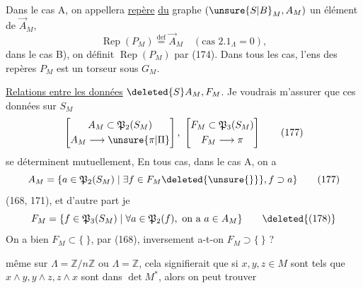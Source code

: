 Dans le cas A, on appellera \uline{repère} \uline{du} graphe  $(\unsure{S|B}_M,A_M)$ un élément de $\overrightarrow A_M$, 
\[
 \operatorname{Rep}(P_M)\overset{\mathrm{def}}{=}\overrightarrow A_M\quad(\text{cas }2.1_{\Lambda}=0),\tag*{(176)}
\]
dans le cas B), on définit $\operatorname{Rep}(P_M)$  par (174). Dans tous les cas, l'ens des repères  $P_M$ est un torseur sous $G_M$.

\uline{Relations entre les données} $\deleted{S}A_M,F_M$. Je voudrais m'assurer que ces données sur $S_M$
\[
 \left[\begin{gathered}A_M\subset\mathfrak P_2(S_M)\\A_M\longrightarrow\unsure{\pi|\Pi}\end{gathered}\right],\
 \left[\begin{gathered}F_M\subset\mathfrak P_3(S_M)\\F_M\longrightarrow\pi\end{gathered}\right]\tag*{(177)}
\]
se déterminent mutuellement, En tous cas, dans le cas A\deleted{\unsure{B)} $(2.1_\Lambda\ne0)$}\inserted{comme B}, on a
\[
 A_M=\{a\in\mathfrak P_2(S_M)\mid\exists f\in F_M\deleted{\unsure{\}}},f\supset a\}\tag*{(177)}
\]
(168,  171), et d'autre part je   
\[
 F_M=\{f\in\mathfrak P_3(S_M)\mid\forall a\in\mathfrak P_2(f),\text{ on a }a\in A_M\}\tag*{\deleted{(178)}}
\]
On a bien $F_M\subset\{\ \}$, par (168), inversement  a-t-on $F_M\supset\{\ \}$ ?

 même sur $\Lambda=\mathbb Z/n\mathbb Z$ ou $\Lambda=\mathbb Z$, cela signifierait que si $x,y,z\in M$ sont tels que $x\wedge y,y\wedge z,z\wedge x$ sont dans $\det M^*$, alors on peut  trouver

